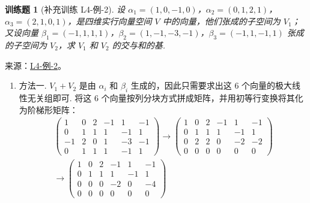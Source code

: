\documentclass[UTF8,12pt,a4paper,fontset=fandol]{ctexart}
\newtheorem{exercise}{训练题}[section]
\begin{document}
\begin{exercise}[补充训练 L4-例-2]\label{prob:L4-例-2}
设 $\alpha_1 = (1, 0, -1, 0)$，$\alpha_2 = (0, 1, 2, 1)$，$\alpha_3 = (2, 1, 0, 1)$，是四维实行向量空间 $V$ 中的向量，他们张成的子空间为 $V_1$；又设向量 $\beta_1 = (-1, 1, 1, 1)$，$\beta_2 = (1, -1, -3, -1)$，$\beta_3 = (-1, 1, -1, 1)$ 张成的子空间为 $V_2$，求 $V_1$ 和 $V_2$ 的交与和的基.
\end{exercise}
\noindent 来源：\href{https://github.com/yhwu-is/Linear-Algebra-Left-Undone/blob/new/%E8%AE%B2%E4%B9%89/%E4%B8%93%E9%A2%98/4%20%E7%BA%BF%E6%80%A7%E7%A9%BA%E9%97%B4%E7%9A%84%E8%BF%90%E7%AE%97.tex}{L4-例-2}。
\begin{solve}
\begin{enumerate}
        \item 方法一.  $V_1 +V_2$ 是由 $\alpha_i$ 和 $\beta_i$ 生成的，因此只需要求出这 $6$ 个向量的极大线性无关组即可. 将这 $6$ 个向量按列分块方式拼成矩阵，并用初等行变换将其化为阶梯形矩阵：
              \begin{align*}
                  \begin{pmatrix}
                      1  & 0 & 2 & -1 & 1  & -1 \\
                      0  & 1 & 1 & 1  & -1 & 1  \\
                      -1 & 2 & 0 & 1  & -3 & -1 \\
                      0  & 1 & 1 & 1  & -1 & 1
                  \end{pmatrix}
                  \xrightarrow{}
                  \begin{pmatrix}
                      1 & 0 & 2 & -1 & 1  & -1 \\
                      0 & 1 & 1 & 1  & -1 & 1  \\
                      0 & 2 & 2 & 0  & -2 & -2 \\
                      0 & 0 & 0 & 0  & 0  & 0
                  \end{pmatrix} \\
                  \xrightarrow{}
                  \begin{pmatrix}
                      1 & 0 & 2 & -1 & 1  & -1 \\
                      0 & 1 & 1 & 1  & -1 & 1  \\
                      0 & 0 & 0 & -2 & 0  & -4 \\
                      0 & 0 & 0 & 0  & 0  & 0
                  \end{pmatrix}
              \end{align*}


\end{enumerate}
\end{solve}
\end{document}
